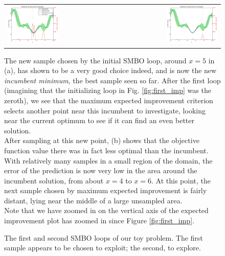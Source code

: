 \begin{figure}
\centering
\begin{tabular}{lr}

\subcaptionbox{}
{\includegraphics[width=0.5\textwidth]{images/ego_ex/1}} &

\subcaptionbox{}
{\includegraphics[width=0.5\textwidth]{images/ego_ex/2}} \\
\end{tabular}
\caption{The first and second SMBO loops of our toy problem. The first sample appears to be chosen to exploit; the second, to explore.\\}


\begin{minipage}{\textwidth}

The new sample chosen by the initial SMBO loop, around $x=5$ in (a), has shown to be a very good choice indeed, and is now the new \emph{incumbent minimum}, the best sample seen so far. After the first loop (imagining that the initializing loop in Fig. \ref{fig:first_imp} was the zeroth), we see that the maximum expected improvement criterion selects another point near this incumbent to investigate, looking near the current optimum to see if it can find an even better solution. \\

After sampling at this new point, (b) shows that the objective function value there was in fact less optimal than the incumbent. With relatively many samples in a small region of the domain, the error of the prediction is now very low in the area around the incumbent solution, from about $x=4$ to $x=6$. At this point, the next sample chosen by maximum expected improvement is fairly distant, lying near the middle of a large unsampled area.\\

Note that we have zoomed in on the vertical axis of the expected improvement plot has zoomed in since Figure \ref{fig:first_imp}.

\end{minipage}


\label{fig:explore_exploit}
\end{figure}


